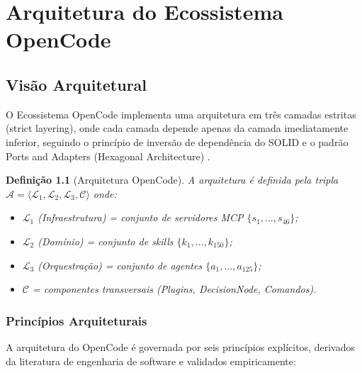 \documentclass[12pt,a4paper,sumario=tradicional]{abntex2}
\newtheorem{definition}{Definição}[chapter]
\begin{document}
\chapter{Arquitetura do Ecossistema OpenCode}

\section{Visão Arquitetural}

O Ecossistema OpenCode implementa uma arquitetura em três camadas estritas (strict layering), onde cada camada depende apenas da camada imediatamente inferior, seguindo o princípio de inversão de dependência do SOLID e o padrão Ports and Adapters (Hexagonal Architecture) \cite{kruchten2009documentation, babar2009supporting}.

\begin{definition}[Arquitetura OpenCode]
A arquitetura é definida pela tripla $\mathcal{A} = \langle \mathcal{L}_1, \mathcal{L}_2, \mathcal{L}_3, \mathcal{C} \rangle$ onde:
\begin{itemize}
    \item $\mathcal{L}_1$ (Infraestrutura) = conjunto de servidores MCP $\{s_1, \ldots, s_{46}\}$;
    \item $\mathcal{L}_2$ (Domínio) = conjunto de skills $\{k_1, \ldots, k_{150}\}$;
    \item $\mathcal{L}_3$ (Orquestração) = conjunto de agentes $\{a_1, \ldots, a_{125}\}$;
    \item $\mathcal{C}$ = componentes transversais (Plugins, DecisionNode, Comandos).
\end{itemize}
\end{definition}

\subsection{Princípios Arquiteturais}

A arquitetura do OpenCode é governada por seis princípios explícitos, derivados da literatura de engenharia de software e validados empiricamente:
\end{document}
